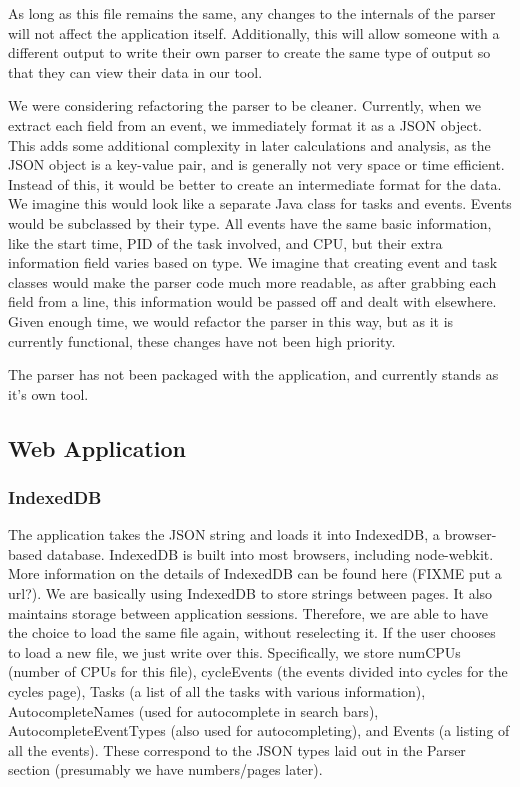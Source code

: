 \documentclass{hmcclinic}
\begin{document}
  As long as this file remains the same, any changes to the internals of the
  parser will not affect the application itself. Additionally, this will allow
  someone with a different output to write their own parser to create the same
  type of output so that they can view their data in our tool.

  We were considering refactoring the parser to be cleaner. Currently, when we
  extract each field from an event, we immediately format it as a JSON object.
  This adds some additional complexity in later calculations and analysis, as
  the JSON object is a key-value pair, and is generally not very space or time
  efficient. Instead of this, it would be better to create an intermediate
  format for the data. We imagine this would look like a separate Java class for
  tasks and events. Events would be subclassed by their type. All events have
  the same basic information, like the start time, PID of the task involved, and
  CPU, but their extra information field varies based on type. We imagine that
  creating event and task classes would make the parser code much more readable,
  as after grabbing each field from a line, this information would be passed off
  and dealt with elsewhere. Given enough time, we would refactor the parser in
  this way, but as it is currently functional, these changes have not been high
  priority.

  The parser has not been packaged with the application, and currently stands as
  it's own tool.

  \subsection{Web Application}

  \subsubsection{IndexedDB}

  The application takes the JSON string and loads it into IndexedDB, a
  browser-based database. IndexedDB is built into most browsers, including
  node-webkit. More information on the details of IndexedDB can be found here
  (FIXME put a url?). We are basically using IndexedDB to store strings between
  pages. It also maintains storage between application sessions. Therefore, we
  are able to have the choice to load the same file again, without reselecting
  it. If the user chooses to load a new file, we just write over this.
  Specifically, we store numCPUs (number of CPUs for this file), cycleEvents
  (the events divided into cycles for the cycles page), Tasks (a list of all the
  tasks with various information), AutocompleteNames (used for autocomplete in
  search bars), AutocompleteEventTypes (also used for autocompleting), and
  Events (a listing of all the events). These correspond to the JSON types laid
  out in the Parser section (presumably we have numbers/pages later).
\end{document}
